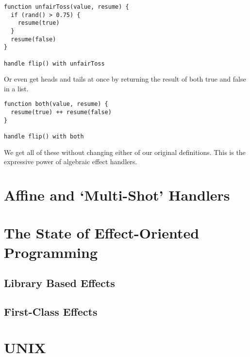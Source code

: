 \documentclass{report}
\begin{document}
\begin{lstlisting}
function unfairToss(value, resume) {
  if (rand() > 0.75) {
    resume(true)
  }
  resume(false)
}

handle flip() with unfairToss
\end{lstlisting}

Or even get heads and tails at once by returning the result of both true and
false in a list.

\begin{lstlisting}
function both(value, resume) {
  resume(true) ++ resume(false)
}

handle flip() with both
\end{lstlisting}

We get all of these without changing either of our original definitions. This
is the expressive power of algebraic effect handlers.

%

\section{Affine and `Multi-Shot' Handlers}

\section{The State of Effect-Oriented Programming}

\subsection{Library Based Effects}

\subsection{First-Class Effects}

\section{\textsc{UNIX}}
\end{document}
